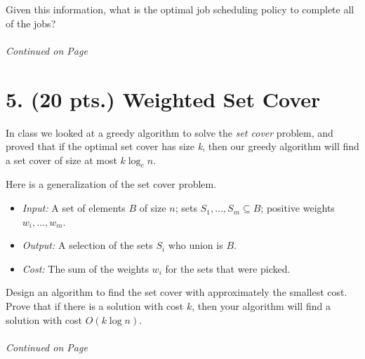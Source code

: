 \documentclass[11pt]{article}
\begin{document}
\begin{itemize}
Given this information, what is the optimal job scheduling policy to complete all of the jobs?

\label{pg:end-of-p4}

%
\paragraph{} \emph{Continued on Page \pageref{pg:p4-continuation}}


\newpage

\section*{5. (20  pts.) Weighted Set Cover}

In class we looked at a greedy algorithm to solve the \emph{set cover} problem,
and proved that if the optimal set cover has size \emph{k}, then our greedy 
algorithm will find a set cover of size at most $k\log_e{n}$.

Here is a generalization of the set cover problem. 

\begin{itemize}
\item \emph{Input:} A set of elements $B$ of size $n$; sets $S_1,\ldots,S_m \subseteq B$;
positive weights $w_i,\ldots,w_m$.

\item \emph{Output:} A selection of the sets $S_i$ who union is $B$.

\item \emph{Cost:} The sum of the weights $w_i$ for the sets that were picked.

\end{itemize}

Design an algorithm to find the set cover with approximately the smallest cost.
Prove that if there is a solution with cost $k$, then your algorithm will find a solution 
with cost $O(k\log n)$.

\label{pg:end-of-p5}


%
\paragraph{} \emph{Continued on Page \pageref{pg:p5-continuation}}



\end{itemize}
\end{document}
